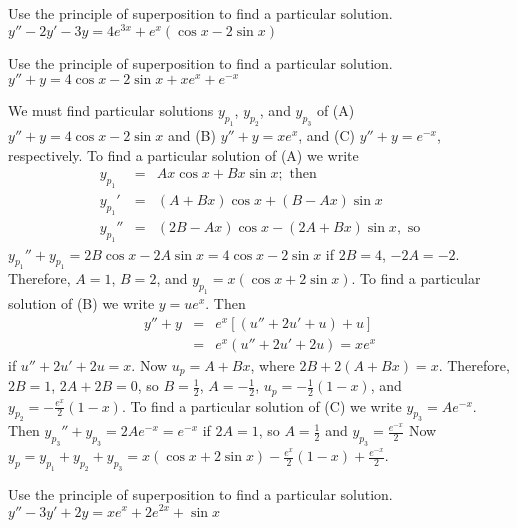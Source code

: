 \documentclass{ximera}
\begin{document}
\begin{problem}\label{exer:5.5.27} Use the
principle
of superposition to find a particular solution. $y''-2y'-3y=4e^{3x}+e^x(\cos x-2\sin x)$
\end{problem}

\begin{problem}\label{exer:5.5.28} Use the
principle
of superposition to find a particular solution. $y''+y=4\cos x-2\sin x+xe^x+e^{-x}$

\begin{solution}
    We must find particular solutions $y_{p_1}$, $y_{p_2}$, and $y_{p_3}$
of
(A) $y''+y=4\cos x-2\sin x$ and
(B) $y''+y=xe^x$, and
(C) $y''+y=e^{-x}$, respectively.
To find a particular solution of (A) we write
\begin{eqnarray*}
y_{p_1}&=&Ax\cos x+Bx\sin x; \mbox{ then}\\
y_{p_1}'&=&(A+Bx)\cos x+(B-Ax)\sin x\\
y_{p_1}''&=&(2B-Ax)\cos x-(2A+Bx)\sin x, \mbox{ so}
\end{eqnarray*}
$y_{p_1}''+y_{p_1}=2B\cos x-2A\sin x=4\cos x-2\sin x$ if $2B=4$,
$-2A=-2$. Therefore, $A=1$, $B=2$, and $y_{p_1}=x(\cos x+2\sin x)$.
To find a particular solution of (B) we write $y=ue^x$. Then
\begin{eqnarray*}
y''+y&=&e^x\left[(u''+2u'+u)+u\right]\\ &=&e^x(u''+2u'+2u)=xe^x
\end{eqnarray*}
if $u''+2u'+2u=x$. Now $u_p=A+Bx$, where $2B+2(A+Bx)=x$. Therefore,
$2B=1$, $2A+2B=0$, so $B=\frac{1}{2}$, $A=-\frac{1}{2}$,
$u_p=-\frac{1}{2}(1-x)$, and $y_{p_2}=-\frac{e^x}{2}(1-x)$. To
find a particular solution of (C) we write $y_{p_3}=Ae^{-x}$. Then
$y_{p_3}''+y_{p_3}=2Ae^{-x}=e^{-x}$ if $2A=1$, so $A=\frac{1}{2}$
and $y_{p_3}=\frac{e^{-x}}{2}$ Now $y_p=y_{p_1}+y_{p_2}+y_{p_3}=
x(\cos x+2\sin x)-\frac{e^x}{2}(1-x)+\frac{e^{-x}}{2}$.
\end{solution}
\end{problem}

\begin{problem}\label{exer:5.5.29} Use the
principle
of superposition to find a particular solution. $y''-3y'+2y=xe^x+2e^{2x}+\sin x$
\end{problem}
\end{document}
